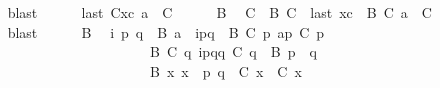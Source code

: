 \begin{isabellebody}
\ \ \ \ \ \ \isamarkupfalse%
\ blast\isanewline
\ \ \ \ \isamarkupfalse%
\ {\isachardoublequoteopen}last\ {\isacharparenleft}{\kern0pt}C{}{\isacharhash}{\kern0pt}xc{\isacharparenright}{\kern0pt}\ {\isasymmidarrow}{\isasymlangle}a{\isacharcomma}{\kern0pt}\ {\isasymzero}{\isasymrangle}{\isasymrightarrow}\ C{\isachardoublequoteclose}\isanewline
\ \ \ \ \isamarkupfalse%
\ B{}\ \isamarkupfalse%
\ C{}\ \ B{}{\isacharcolon}{\kern0pt}\ {\isachardoublequoteopen}C{}\ {\isacharequal}{\kern0pt}\ last\ {\isacharparenleft}{\kern0pt}{\isasymC}\isactrlsub {\isasymI}\isactrlsub {\isasymzero}{\isacharhash}{\kern0pt}xc{\isacharparenright}{\kern0pt}{\isachardoublequoteclose}\ \ B{}{\isacharcolon}{\kern0pt}\ {\isachardoublequoteopen}C{}\ {\isasymmidarrow}{\isasymlangle}a{\isacharcomma}{\kern0pt}\ {\isasymzero}{\isasymrangle}{\isasymrightarrow}\ C{\isachardoublequoteclose}\isanewline
\ \ \ \ \ \ \isamarkupfalse%
\ blast\isanewline
\ \ \ \ \isamarkupfalse%
\ B{}\ \isamarkupfalse%
\ i\ p\ q\ \ B{}{\isacharcolon}{\kern0pt}\ {\isachardoublequoteopen}a\ {\isacharequal}{\kern0pt}\ {\isacharbang}{\kern0pt}{\isasymlangle}{\isacharparenleft}{\kern0pt}i\isactrlbsup p{\isasymrightarrow}q\isactrlesup {\isacharparenright}{\kern0pt}{\isasymrangle}{\isachardoublequoteclose}\ \ B{}{\isacharcolon}{\kern0pt}\ {\isachardoublequoteopen}C{}\ p\ {\isasymmidarrow}a{\isasymrightarrow}p\ {\isacharparenleft}{\kern0pt}C\ p{\isacharparenright}{\kern0pt}{\isachardoublequoteclose}\isanewline
\ \ \ \ \ \ \ \ \ \ \ \ \ \ \ \ \ \ \ \ \ \ \ \ \ \ \ \ B{}{\isacharcolon}{\kern0pt}\ {\isachardoublequoteopen}C{}\ q\ {\isasymmidarrow}{\isacharparenleft}{\kern0pt}{\isacharquery}{\kern0pt}{\isasymlangle}{\isacharparenleft}{\kern0pt}i\isactrlbsup p{\isasymrightarrow}q\isactrlesup {\isacharparenright}{\kern0pt}{\isasymrangle}{\isacharparenright}{\kern0pt}{\isasymrightarrow}q\ {\isacharparenleft}{\kern0pt}C\ q{\isacharparenright}{\kern0pt}{\isachardoublequoteclose}\ \ B{}{}{\isacharcolon}{\kern0pt}\ {\isachardoublequoteopen}p\ {\isasymnoteq}\ q{\isachardoublequoteclose}\isanewline
\ \ \ \ \ \ \ \ \ \ \ \ \ \ \ \ \ \ \ \ \ \ \ \ \ \ \ \ B{}{}{\isacharcolon}{\kern0pt}\ {\isachardoublequoteopen}{\isasymforall}x{\isachardot}{\kern0pt}\ x\ {\isasymnotin}\ {\isacharbraceleft}{\kern0pt}p{\isacharcomma}{\kern0pt}\ q{\isacharbraceright}{\kern0pt}\ {\isasymlongrightarrow}\ C{}\ x\ {\isacharequal}{\kern0pt}\ C\ x{\isachardoublequoteclose}\isanewline

\end{isabellebody}

